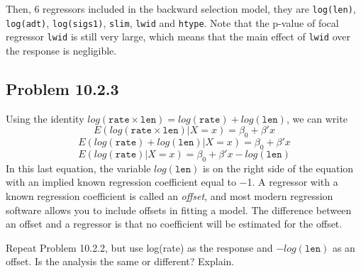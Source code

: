 \documentclass[12pt,oneside,a4paper]{article}\usepackage[]{graphicx}\usepackage[]{xcolor}
\newcommand{\subproblem}[1]
{
    \subsection*{Problem {#1}}
}
\newcommand{\m}[1]{\texttt{{#1}}}
\begin{document}
Then, 6 regressors included in the backward selection model, they are \m{log(len)}, \m{log(adt)}, \m{log(sigs1)}, \m{slim}, \m{lwid} and \m{htype}. Note that the p-value of focal regressor \m{lwid} is still very large, which means that the main effect of \m{lwid} over the response is negligible.

\subproblem{10.2.3}
Using the identity $log(\m{rate}\times\m{len}) = log(\m{rate}) + log(\m{len})$, we can write
$$E(log(\m{rate}\times\m{len})|X = x) = \beta_{0} + \beta'x$$
$$E(log(\m{rate}) + log(\m{len})|X = x) = \beta_{0} + \beta'x$$
$$E(log(\m{rate})|X=x) = \beta_{0} + \beta'x - log(\m{len})$$
In this last equation, the variable $log(\m{len})$ is on the right side of the equation with an implied known regression coefficient equal to −1. A regressor with a known regression coefficient is called an \emph{offset}, and most modern regression software allows you to include offsets in fitting a model. The difference between an offset and a regressor is that no coefficient will be estimated for the offset.\par
Repeat Problem 10.2.2, but use log(rate) as the response and $−log(\m{len})$ as an offset. Is the analysis the same or different? Explain.
\end{document}

